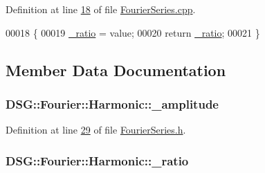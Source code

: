 Definition at line \hyperlink{_fourier_series_8cpp_source_l00018}{18} of file \hyperlink{_fourier_series_8cpp_source}{Fourier\+Series.\+cpp}.


\begin{DoxyCode}
00018                                                                       \{
00019     \hyperlink{class_d_s_g_1_1_fourier_1_1_harmonic_aa7138674df42fea66287ea31275bb14a}{\_ratio} = value;
00020     \textcolor{keywordflow}{return} \hyperlink{class_d_s_g_1_1_fourier_1_1_harmonic_aa7138674df42fea66287ea31275bb14a}{\_ratio};
00021 \}
\end{DoxyCode}


\subsection{Member Data Documentation}
\hypertarget{class_d_s_g_1_1_fourier_1_1_harmonic_a76156f1ce5ccf45a9d4bfab38e932dfb}{
\subsubsection[{\+\_\+amplitude}]{ D\+S\+G\+::\+Fourier\+::\+Harmonic\+::\+\_\+amplitude\hspace{0.3cm}{\ttfamily [protected]}}}\label{class_d_s_g_1_1_fourier_1_1_harmonic_a76156f1ce5ccf45a9d4bfab38e932dfb}


Definition at line \hyperlink{_fourier_series_8h_source_l00029}{29} of file \hyperlink{_fourier_series_8h_source}{Fourier\+Series.\+h}.

\hypertarget{class_d_s_g_1_1_fourier_1_1_harmonic_aa7138674df42fea66287ea31275bb14a}{
\subsubsection[{\+\_\+ratio}]{ D\+S\+G\+::\+Fourier\+::\+Harmonic\+::\+\_\+ratio\hspace{0.3cm}{\ttfamily [protected]}}}\label{class_d_s_g_1_1_fourier_1_1_harmonic_aa7138674df42fea66287ea31275bb14a}


